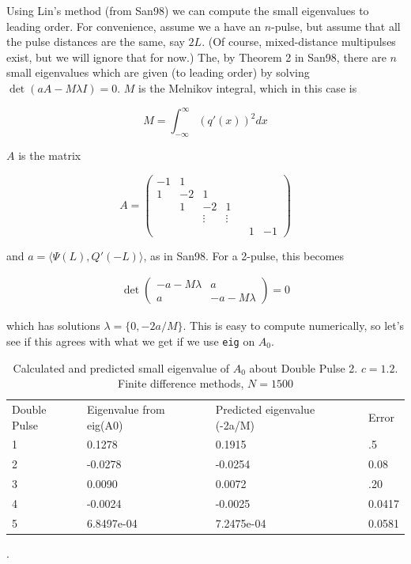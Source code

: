 \documentclass[12pt]{article}
\begin{document}
Using Lin's method (from San98) we can compute the small eigenvalues to leading order. For convenience, assume we a have an $n$-pulse, but assume that all the pulse distances are the same, say $2L$. (Of course, mixed-distance multipulses exist, but we will ignore that for now.) The, by Theorem 2 in San98, there are $n$ small eigenvalues which are given (to leading order) by solving $\det(aA - M \lambda I) = 0$. $M$ is the Melnikov integral, which in this case is

\begin{equation}
M = \int_{-\infty}^\infty (q'(x))^2 dx
\end{equation}

$A$ is the matrix

\begin{equation}
A = \begin{pmatrix}
-1 & 1 \\
1  & -2 & 1 \\
   & 1  & -2 & 1 \\
   & & \vdots & \vdots \\
   & & & & & 1 & -1
\end{pmatrix}
\end{equation}

and $a = \langle \Psi(L), Q'(-L) \rangle$, as in San98. For a 2-pulse, this becomes

\begin{align*}
\det \begin{pmatrix}
-a - M \lambda & a \\
a & -a - M \lambda
\end{pmatrix} = 0
\end{align*}

which has solutions $\lambda = \{ 0, -2a/M \}$. This is easy to compute numerically, so let's see if this agrees with what we get if we use \texttt{eig} on $A_0$.

\begin{table}[H]
\begin{tabular}{llll}
Double Pulse & Eigenvalue from eig(A0) & Predicted eigenvalue (-2a/M) & Error  \\
1            & 0.1278                  & 0.1915                       & .5     \\
2            & -0.0278                 & -0.0254                      & 0.08   \\
3            & 0.0090                  & 0.0072                       & .20    \\
4            & -0.0024                 & -0.0025                      & 0.0417 \\
5            & 6.8497e-04              & 7.2475e-04                   & 0.0581
\end{tabular}
\caption{Calculated and predicted small eigenvalue of $A_0$ about Double Pulse 2. $c = 1.2$. Finite difference methods, $N = 1500$}.
\end{table}
\end{document}
